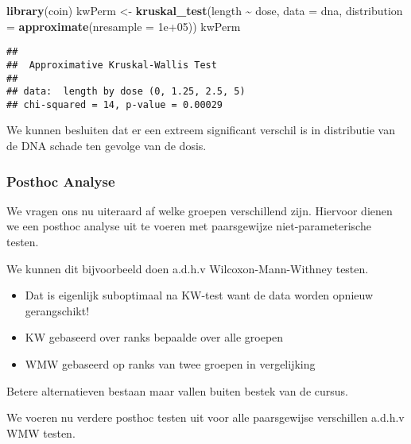 \documentclass[
  12pt,dutch,coursenotes]{book}
\newenvironment{Shaded}{\begin{snugshade}}{\end{snugshade}}
\newcommand{\DataTypeTok}[1]{\textcolor[rgb]{0.13,0.29,0.53}{#1}}
\newcommand{\FloatTok}[1]{\textcolor[rgb]{0.00,0.00,0.81}{#1}}
\newcommand{\KeywordTok}[1]{\textcolor[rgb]{0.13,0.29,0.53}{\textbf{#1}}}
\newcommand{\NormalTok}[1]{#1}
\newcommand{\OperatorTok}[1]{\textcolor[rgb]{0.81,0.36,0.00}{\textbf{#1}}}
\newcommand{\StringTok}[1]{\textcolor[rgb]{0.31,0.60,0.02}{#1}}
\providecommand{\tightlist}{%
  \setlength{\itemsep}{0pt}\setlength{\parskip}{0pt}}
\theoremstyle{definition}
\theoremstyle{definition}
\theoremstyle{definition}
\theoremstyle{remark}
\begin{document}
\begin{Shaded}
\begin{Highlighting}[]
\KeywordTok{library}\NormalTok{(coin)}
\NormalTok{kwPerm \textless{}{-}}\StringTok{ }\KeywordTok{kruskal\_test}\NormalTok{(length }\OperatorTok{\textasciitilde{}}\StringTok{ }\NormalTok{dose, }\DataTypeTok{data =}\NormalTok{ dna, }\DataTypeTok{distribution =} \KeywordTok{approximate}\NormalTok{(}\DataTypeTok{nresample =} \FloatTok{1e+05}\NormalTok{))}
\NormalTok{kwPerm}
\end{Highlighting}
\end{Shaded}

\begin{verbatim}
## 
##  Approximative Kruskal-Wallis Test
## 
## data:  length by dose (0, 1.25, 2.5, 5)
## chi-squared = 14, p-value = 0.00029
\end{verbatim}

We kunnen besluiten dat er een extreem significant verschil is in distributie van de DNA schade ten gevolge van de dosis.

\hypertarget{posthoc-analyse}{%
\subsubsection{Posthoc Analyse}\label{posthoc-analyse}}

We vragen ons nu uiteraard af welke groepen verschillend zijn. Hiervoor dienen we een posthoc analyse uit te voeren met paarsgewijze niet-parameterische testen.

We kunnen dit bijvoorbeeld doen a.d.h.v Wilcoxon-Mann-Withney testen.

\begin{itemize}
\tightlist
\item
  Dat is eigenlijk suboptimaal na KW-test want de data worden opnieuw gerangschikt!
\item
  KW gebaseerd over ranks bepaalde over alle groepen
\item
  WMW gebaseerd op ranks van twee groepen in vergelijking
\end{itemize}

Betere alternatieven bestaan maar vallen buiten bestek van de cursus.

We voeren nu verdere posthoc testen uit voor alle paarsgewijse verschillen a.d.h.v WMW testen.

\begin{Shaded}
\end{Shaded}
\end{document}
